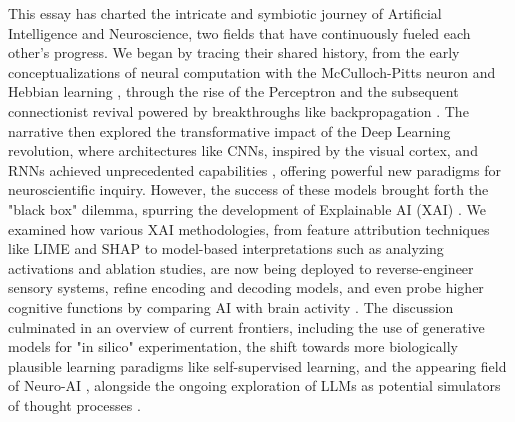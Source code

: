 This essay has charted the intricate and symbiotic journey of Artificial Intelligence and Neuroscience, two fields that have continuously fueled each other's progress. We began by tracing their shared history, from the early conceptualizations of neural computation with the McCulloch-Pitts neuron \cite{mcculloch1943logical} and Hebbian learning \cite{hebb1949organization}, through the rise of the Perceptron \cite{rosenblatt1958perceptron} and the subsequent connectionist revival \cite{mcclelland1986parallel} powered by breakthroughs like backpropagation \cite{rumelhart1986learning}. The narrative then explored the transformative impact of the Deep Learning revolution, where architectures like CNNs, inspired by the visual cortex, and RNNs achieved unprecedented capabilities \cite{lecun2015deep, yamins2016using}, offering powerful new paradigms for neuroscientific inquiry. However, the success of these models brought forth the "black box" dilemma, spurring the development of Explainable AI (XAI) \cite{doshi2017towards, miller2019explanation}. We examined how various XAI methodologies, from feature attribution techniques like LIME and SHAP \cite{ribeiro2016why, lundberg2017unified} to model-based interpretations such as analyzing activations \cite{olah2018building} and ablation studies, are now being deployed to reverse-engineer sensory systems, refine encoding and decoding models, and even probe higher cognitive functions by comparing AI with brain activity \cite{kriegeskorte2018cognitive, richards2019deep, caucheteux2022brains, sun2021bursting}. The discussion culminated in an overview of current frontiers, including the use of generative models for "in silico" experimentation, the shift towards more biologically plausible learning paradigms like self-supervised learning, and the appearing field of Neuro-AI \cite{richards2019deep}, alongside the ongoing exploration of LLMs as potential simulators of thought processes \cite{wei2022chain}.

